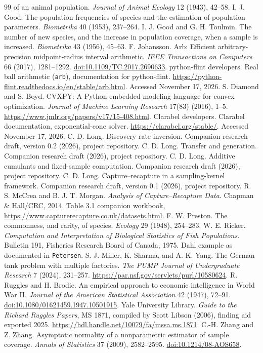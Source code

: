 \documentclass[11pt]{article}
\theoremstyle{remark}\newtheorem{remark}[theorem]{Remark}
\begin{document}
\begin{thebibliography}{99}
of an animal population. \emph{Journal of Animal Ecology} 12 (1943), 42--58.
 I. J. Good. The population frequencies of species and the
estimation of population parameters. \emph{Biometrika} 40 (1953), 237--264.
 I. J. Good and G. H. Toulmin. The number of new species,
and the increase in population coverage, when a sample is increased.
\emph{Biometrika} 43 (1956), 45--63.
 F. Johansson. Arb: Efficient arbitrary-precision
midpoint-radius interval arithmetic. \emph{IEEE Transactions on Computers}
66 (2017), 1281--1292. \href{https://doi.org/10.1109/TC.2017.2690633}{doi:10.1109/TC.2017.2690633}.
 python-flint developers. Real ball arithmetic
(\texttt{arb}), documentation for python-flint.
\url{https://python-flint.readthedocs.io/en/stable/arb.html}. Accessed November 17, 2026.
 S. Diamond and S. Boyd. CVXPY: A Python-embedded modeling
language for convex optimization. \emph{Journal of Machine Learning Research}
17(83) (2016), 1--5. \url{https://www.jmlr.org/papers/v17/15-408.html}.
 Clarabel developers. Clarabel documentation, exponential-cone
solver. \url{https://clarabel.org/stable/}. Accessed November 17, 2026.
 C. D. Long. Discovery-rate inversion. Companion
research draft, version 0.2 (2026), project repository.
 C. D. Long. Transfer and generation. Companion
research draft (2026), project repository.
 C. D. Long. Additive cumulants and fixed-sample
computation. Companion research draft (2026), project repository.
 C. D. Long. Capture--recapture in a sampling-kernel
framework. Companion research draft, version 0.1 (2026), project repository.
 R. S. McCrea and B. J. T. Morgan. \emph{Analysis of
Capture--Recapture Data}. Chapman \& Hall/CRC, 2014. Table 3.1 companion workbook,
\url{https://www.capturerecapture.co.uk/datasets.html}.
 F. W. Preston. The commonness, and rarity, of species.
\emph{Ecology} 29 (1948), 254--283.
 W. E. Ricker. \emph{Computation and Interpretation of
Biological Statistics of Fish Populations}. Bulletin 191, Fisheries Research
Board of Canada, 1975. Dahl example as documented in \texttt{Petersen}.
 S. J. Miller, K. Sharma, and A. K. Yang.
The German tank problem with multiple factories. \emph{The PUMP Journal of
Undergraduate Research} 7 (2024), 231--257.
\url{https://par.nsf.gov/servlets/purl/10580624}.
 R. Ruggles and H. Brodie. An empirical approach to economic
intelligence in World War II. \emph{Journal of the American Statistical
Association} 42 (1947), 72--91.
\href{https://doi.org/10.1080/01621459.1947.10501915}{doi:10.1080/01621459.1947.10501915}.
 Yale University Library. \emph{Guide to the Richard Ruggles
Papers}, MS 1871, compiled by Scott Libson (2006), finding aid exported 2025.
\url{https://hdl.handle.net/10079/fa/mssa.ms.1871}.
 C.-H. Zhang and Z. Zhang. Asymptotic normality of a
nonparametric estimator of sample coverage. \emph{Annals of Statistics} 37
(2009), 2582--2595. \href{https://doi.org/10.1214/08-AOS658}{doi:10.1214/08-AOS658}.
\end{thebibliography}
\end{document}
